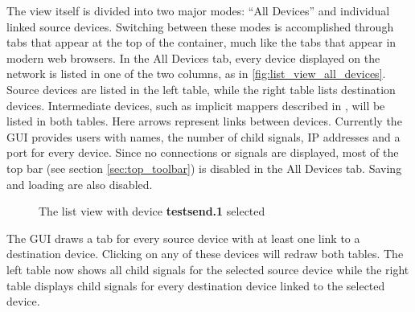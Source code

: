 The view itself is divided into two major modes: ``All Devices'' and individual linked source devices. Switching between these modes is accomplished through tabs that appear at the top of the container, much like the tabs that appear in modern web browsers. In the All Devices tab, every device displayed on the network is listed in one of the two columns, as in \ref{fig:list_view_all_devices}. Source devices are listed in the left table, while the right table lists destination devices. Intermediate devices, such as implicit mappers described in \cite{interpolated_mappings}, will be listed in both tables. Here arrows represent links between devices. Currently the GUI provides users with names, the number of child signals, IP addresses and a port for every device. Since no connections or signals are displayed, most of the top bar (see section \ref{sec:top_toolbar}) is disabled in the All Devices tab. Saving and loading are also disabled.

\begin{figure}[ht]
\centering
\caption{The list view with device \textbf{testsend.1} selected}
\label{fig:list_view_single_link}
\end{figure}

The GUI draws a tab for every source device with at least one link to a destination device. Clicking on any of these devices will redraw both tables. The left table now shows all child signals for the selected source device while the right table displays child signals for every destination device linked to the selected device. 

